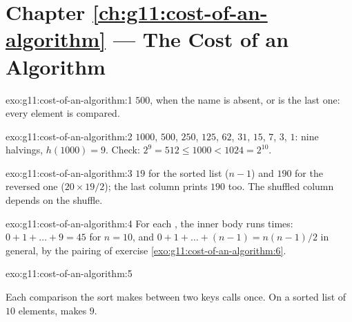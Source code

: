\section*{Chapter \ref{ch:g11:cost-of-an-algorithm} --- The Cost of an Algorithm}

\begin{solution}{exo:g11:cost-of-an-algorithm:1}
$500$, when the name is absent, or is the last one: every element is compared.
\end{solution}

\begin{solution}{exo:g11:cost-of-an-algorithm:2}
$1000$, $500$, $250$, $125$, $62$, $31$, $15$, $7$, $3$, $1$: nine halvings, $h(1000) = 9$. Check:
$2^9 = 512 \le 1000 < 1024 = 2^{10}$.
\end{solution}

\begin{solution}{exo:g11:cost-of-an-algorithm:3}
$19$ for the sorted list ($n - 1$) and $190$ for the reversed one ($20 \times 19 / 2$); the last column prints $190$
too. The shuffled column depends on the shuffle.
\end{solution}

\begin{solution}{exo:g11:cost-of-an-algorithm:4}
For each , the inner body runs  times: $0 + 1 + \dots + 9 = 45$ for $n = 10$, and
$0 + 1 + \dots + (n - 1) = n(n - 1)/2$ in general, by the pairing of exercise
\ref{exo:g11:cost-of-an-algorithm:6}.
\end{solution}

\begin{solution}{exo:g11:cost-of-an-algorithm:5}
\smallskip\noindent\hspace*{2em}

\noindent\hspace*{4em}

\noindent\hspace*{4em}

\noindent\hspace*{6em}

\noindent\hspace*{6em}

\noindent\hspace*{6em}

\noindent\hspace*{4em}

\noindent\hspace*{4em}

\noindent\hspace*{4em}

\smallskip\noindent Each comparison the sort makes between two keys calls  once. On a sorted list of $10$
elements,  makes $9$.
\end{solution}

